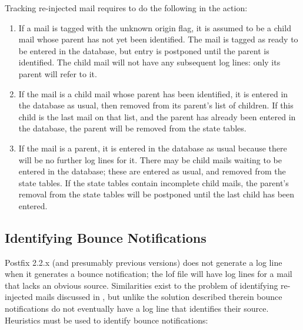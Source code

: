 Tracking re-injected mail requires \parsername{} to do the following in the
 action:

\begin{enumerate}

    \item If a mail is tagged with the unknown origin flag, it is assumed
        to be a child mail whose parent has not yet been identified.  The
        mail is tagged as ready to be entered in the database, but entry is
        postponed until the parent is identified.  The child mail will not
        have any subsequent log lines: only its parent will refer to it.

    \item If the mail is a child mail whose parent has been identified, it
        is entered in the database as usual, then removed from its parent's
        list of children.  If this child is the last mail on that list, and
        the parent has already been entered in the database, the parent
        will be removed from the state tables.

    \item If the mail is a parent, it is entered in the database as usual
        because there will be no further log lines for it.  There may be
        child mails waiting to be entered in the database; these are
        entered as usual, and removed from the state tables.  If the state
        tables contain incomplete child mails, the parent's removal from
        the state tables will be postponed until the last child has been
        entered.

\end{enumerate}

\subsection{Identifying Bounce Notifications}

\label{identifying bounce notifications}

Postfix 2.2.x (and presumably previous versions) does not generate a log
line when it generates a bounce notification; the lof file will have log
lines for a mail that lacks an obvious source.  Similarities exist to the
problem of identifying re-injected mails discussed in , but unlike the solution described therein bounce
notifications do not eventually have a log line that identifies their
source.  Heuristics must be used to identify bounce notifications:

